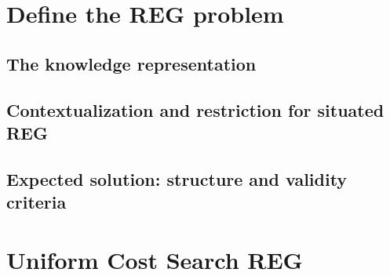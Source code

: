 
\section{Define the REG problem}

\subsection{The knowledge representation}

\subsection{Contextualization and restriction for situated REG}

\subsection{Expected solution: structure and validity criteria}

\section{Uniform Cost Search REG}

